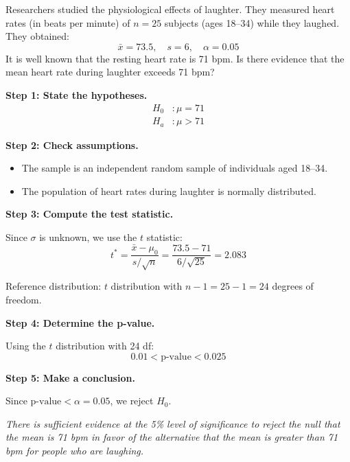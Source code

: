 \begin{example}

Researchers studied the physiological effects of laughter. They measured heart rates (in beats per minute) of \textbf{$n = 25$} subjects (ages 18–34) while they laughed. They obtained:
\[
\bar{x} = 73.5, \quad s = 6, \quad \alpha = 0.05
\]
It is well known that the resting heart rate is 71 bpm. Is there evidence that the mean heart rate during laughter exceeds 71 bpm?

\textbf{Step 1: State the hypotheses.}
\[
\begin{aligned}
H_0 &: \mu = 71 \\
H_a &: \mu > 71
\end{aligned}
\]

\textbf{Step 2: Check assumptions.}
\begin{itemize}
  \item The sample is an independent random sample of individuals aged 18–34.
  \item The population of heart rates during laughter is normally distributed.
\end{itemize}

\textbf{Step 3: Compute the test statistic.}

Since $\sigma$ is unknown, we use the $t$ statistic:
\[
t^\ast = \frac{\bar{x} - \mu_0}{s / \sqrt{n}} = \frac{73.5 - 71}{6 / \sqrt{25}} = 2.083
\]

Reference distribution: $t$ distribution with $n - 1 = 25 - 1 = 24$ degrees of freedom.

\textbf{Step 4: Determine the p-value.}

Using the $t$ distribution with 24 df:
\[
0.01 < \text{p-value} < 0.025
\]

\textbf{Step 5: Make a conclusion.}

Since $\text{p-value} < \alpha = 0.05$, we reject $H_0$.

\textit{There is sufficient evidence at the 5\% level of significance to reject the null that the mean is 71 bpm in favor of the alternative that the mean is greater than 71 bpm for people who are laughing.}


\end{example}
